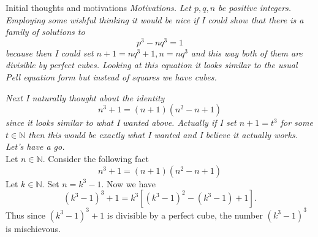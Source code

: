 \documentclass{article}
\begin{document}
\begin{hint}{Initial thoughts and motivations}
\textit{Motivations.}
\textit{
Let $p,q,n$ be positive integers. Employing
some wishful thinking it would be nice if I could show that there
is a family of solutions to}
$$
p^3 - nq^3 = 1
$$
\textit{
because then I could set $n+1 = nq^3 + 1, n = nq^3$ and this way both of
them are divisible by perfect cubes. Looking at this equation it looks
similar to the usual Pell equation form but instead of squares we have
cubes.} \vspace{0.2cm}

\textit{Next I naturally thought about the identity}
$$
n^3 + 1 = (n+1)(n^2 - n + 1)
$$
\textit{
since it looks similar to what I wanted above. Actually if I set
$n+1 = t^3$ for some $t \in \mathbb{N}$ then this would be exactly what
I wanted and I believe it actually works. Let's have a go.} \\

Let $n \in \mathbb{N}$. Consider the following fact
$$
n^3 + 1 = (n + 1)(n^2 - n + 1)
$$
Let $k \in \mathbb{N}$. Set $n = k^3 - 1$. Now we have
$$
(k^3 - 1)^3 + 1 = k^3 \left[ (k^3 - 1)^2 - (k^3 - 1) + 1 \right].
$$
Thus since $(k^3 - 1)^3 + 1$ is divisible by a perfect cube, the number
$(k^3 - 1)^3$ is mischievous. \\


\end{hint}
\end{document}
